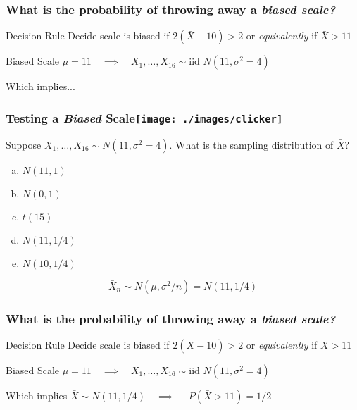 \begin{frame}
	\frametitle{What is the probability of throwing away a \em{biased} scale?}

	\begin{block}
		{Decision Rule}
		Decide scale is biased if $2(\bar{X} - 10) > 2$ or \emph{equivalently} if \alert{$\bar{X} > 11$} 
	\end{block}
	\begin{block}
		{Biased Scale}
		$\mu = 11 \quad \implies \quad X_1, \hdots, X_{16} \sim \mbox{iid } N(11, \sigma^2 = 4)$
	\end{block}
	\begin{alertblock}
		{Which implies...}
	\end{alertblock}
\end{frame}
\begin{frame}
	\frametitle{Testing a \emph{Biased} Scale\hfill \texttt{[image: ./images/clicker]}}

	Suppose $X_1, \hdots, X_{16} \sim N(11, \sigma^2 = 4)$. What is the sampling distribution of $\bar{X}$?
	
	\vspace{1em}

	\begin{enumerate}[(a)]
		\item $N(11, 1)$
		\item $N(0, 1)$ 
		\item $t(15)$
		\item $N(11, 1/4)$ 
		\item $N(10, 1/4)$
	\end{enumerate}
\pause

\vspace{1em}

\alert{$$\bar{X}_n \sim N(\mu, \sigma^2/n) = N(11, 1/4)$$}
\end{frame}
\begin{frame}
	\frametitle{What is the probability of throwing away a \em{biased} scale?}

	\begin{block}
		{Decision Rule}
		Decide scale is biased if $2(\bar{X} - 10) > 2$ or \emph{equivalently} if \alert{$\bar{X} > 11$} 
	\end{block}
	\begin{block}
		{Biased Scale}
		$\mu = 11 \quad \implies \quad X_1, \hdots, X_{16} \sim \mbox{iid } N(11, \sigma^2 = 4)$
	\end{block}
	\begin{alertblock}
		{Which implies}
		$\bar{X} \sim N(11, 1/4)\quad \implies \quad$  \alert{$P(\bar{X}>11) = 1/2$} 
	\end{alertblock}

\vspace{1em}

	\alert{}
\end{frame}

